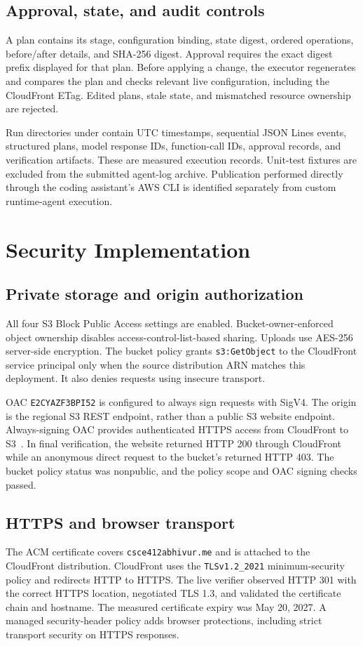 \documentclass[11pt]{article}
\begin{document}
\subsection{Approval, state, and audit controls}
A plan contains its stage, configuration binding, state digest, ordered operations, before/after details, and SHA-256 digest. Approval requires the exact digest prefix displayed for that plan. Before applying a change, the executor regenerates and compares the plan and checks relevant live configuration, including the CloudFront ETag. Edited plans, stale state, and mismatched resource ownership are rejected.

Run directories under  contain UTC timestamps, sequential JSON Lines events, structured plans, model response IDs, function-call IDs, approval records, and verification artifacts. These are measured execution records. Unit-test fixtures are excluded from the submitted agent-log archive. Publication performed directly through the coding assistant's AWS CLI is identified separately from custom runtime-agent execution.

\section{Security Implementation}
\subsection{Private storage and origin authorization}
All four S3 Block Public Access settings are enabled. Bucket-owner-enforced object ownership disables access-control-list-based sharing. Uploads use AES-256 server-side encryption. The bucket policy grants \texttt{s3:GetObject} to the CloudFront service principal only when the source distribution ARN matches this deployment. It also denies requests using insecure transport.

OAC \texttt{E2CYAZF3BPI52} is configured to always sign requests with SigV4. The origin is the regional S3 REST endpoint, rather than a public S3 website endpoint. Always-signing OAC provides authenticated HTTPS access from CloudFront to S3~\cite{oac}. In final verification, the website returned HTTP 200 through CloudFront while an anonymous direct request to the bucket's  returned HTTP 403. The bucket policy status was nonpublic, and the policy scope and OAC signing checks passed.

\subsection{HTTPS and browser transport}
The ACM certificate covers \texttt{csce412abhivur.me} and is attached to the CloudFront distribution. CloudFront uses the \texttt{TLSv1.2\_2021} minimum-security policy and redirects HTTP to HTTPS. The live verifier observed HTTP 301 with the correct HTTPS location, negotiated TLS 1.3, and validated the certificate chain and hostname. The measured certificate expiry was May 20, 2027. A managed security-header policy adds browser protections, including strict transport security on HTTPS responses.
\end{document}
